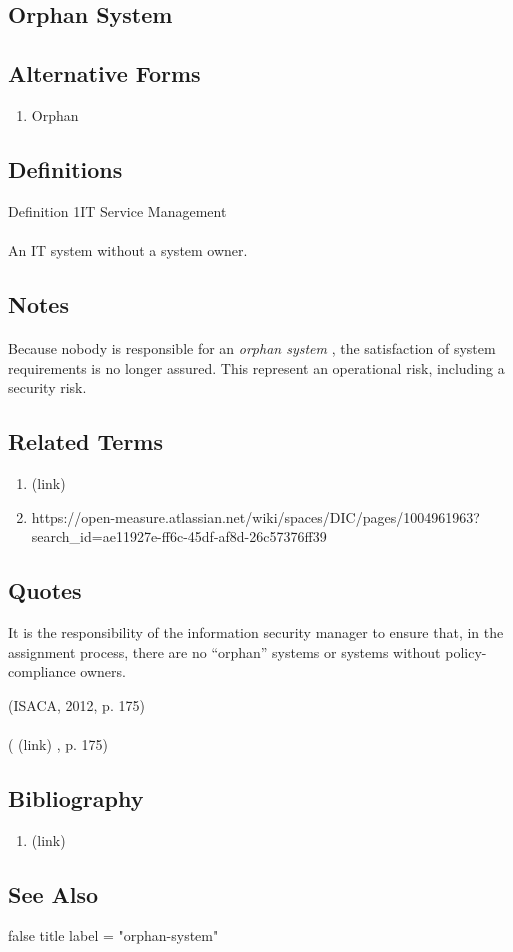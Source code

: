 \newpage \subsection*{Orphan System } \subsection*{Alternative Forms } \begin{enumerate} \item  Orphan  \end{enumerate} \subsection*{Definitions } \begin{DIC_Def}{Definition 1IT Service Management }{} \paragraph{} An IT system without a system owner.  \end{DIC_Def} \subsection*{Notes } \paragraph{} Because nobody is responsible for an  \emph{ orphan system  } , the satisfaction of system requirements is no longer assured. This represent an operational risk, including a security risk.  \subsection*{Related Terms } \begin{enumerate} \item  (link) \href{Orphan (Dictionary Entry) }{ }   \item  https://open-measure.atlassian.net/wiki/spaces/DIC/pages/1004961963?search\_id=ae11927e-ff6c-45df-af8d-26c57376ff39    \end{enumerate} \subsection*{Quotes } \begin{DIC_BlockQuote} It is the responsibility of the information security manager to ensure that, in the assignment process, there are no ``orphan'' systems or systems without policy-compliance owners.  \end{DIC_BlockQuote} (ISACA, 2012, p. 175)  \paragraph{} (  (link) \href{ISACA, 2012 }{ } , p. 175)  \subsection*{Bibliography } \begin{enumerate} \item  (link) \href{ISACA, 2012 }{ }   \end{enumerate} \subsection*{See Also } false  title  label = "orphan-system"  